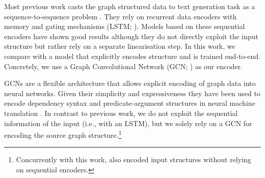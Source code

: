 \documentclass[11pt,a4paper,dvipsnames]{article}
\begin{document}
Most previous work casts the graph structured data to text generation 
task as a sequence-to-sequence problem \cite{gardent-EtAl:2017:INLG2017,ferreira2017linguistic,konstas2017neural}.
They rely on recurrent data encoders with memory and gating
mechanisms (LSTM; \cite{lstm1997}). 
Models based on these sequential encoders have shown 
good results although they do not directly exploit
the input structure but rather rely on a separate linearisation step. 
In this work, we compare with a model that explicitly encodes 
structure and is trained end-to-end.
Concretely, we use a Graph Convolutional Network 
(GCN; \cite{kipf2016semi,marcheggiani2017encoding}) 
as our encoder.

GCNs are a flexible architecture that allows explicit encoding 
of graph data into neural networks. Given their simplicity and 
expressiveness they have been used to encode dependency syntax 
and predicate-argument structures in neural machine translation 
\cite{bastings2017graph,marcheggiani2018exploiting}.
In contrast to previous work, we do not exploit the sequential 
information of the input (i.e., with an LSTM), but we solely rely 
on a GCN for encoding the source graph structure.\footnote{Concurrently with this work,  also encoded input structures without relying on sequential encoders.}
\end{document}
